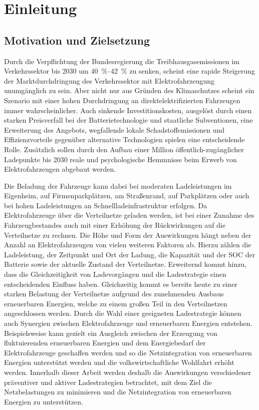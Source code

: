 \section{Einleitung}


\subsection{Motivation und Zielsetzung}

Durch die Verpflichtung der Bundesregierung die Treibhausgasemissionen im Verkehrssektor bis \num{2030} um \SIrange[range-phrase=~bis~]{40}{42}{\percent} \cite{BundesministeriumUmwelt2019} zu senken, scheint eine rapide Steigerung der Marktdurchdringung des Verkehrssektor mit Elektrofahrzeugung unumgänglich zu sein.
Aber nicht nur aus Gründen des Klimaschutzes scheint ein Szenario mit einer hohen Durchdringung an direktelektrifizierten Fahrzeugen immer wahrscheinlicher.
Auch sinkende Investitionskosten, ausgelöst durch einen starken Preisverfall bei der Batterietechnologie und staatliche Subventionen, eine Erweiterung des Angebots, wegfallende lokale Schadstoffemissionen und Effizienzvorteile gegenüber alternative Technologien spielen eine entscheidende Rolle.
Zusätzlich sollen durch den Aufbau einer Million öffentlich-zugänglicher Ladepunkte bis \num{2030} \cite{DieBundesregierung2019} reale und psychologische Hemmnisse beim Erwerb von Elektrofahrzeugen abgebaut werden.\medskip

Die Beladung der Fahrzeuge kann dabei bei moderaten Ladeleistungen im Eigenheim, auf Firmenparkplätzen, am Straßenrand, auf Parkplätzen oder auch bei hohen Ladeleistungen an Schnellladeinfrastruktur erfolgen.
Da Elektrofahrzeuge über die Verteilnetze geladen werden, ist bei einer Zunahme des Fahrzeugbestandes auch mit einer Erhöhung der Rückwirkungen auf die Verteilnetze zu rechnen.
Die Höhe und Form der Auswirkungen hängt neben der Anzahl an Elektrofahrzeugen von vielen weiteren Faktoren ab.
Hierzu zählen die Ladeleistung, der Zeitpunkt und Ort der Ladung, die Kapazität und der \gls{SOC} der Batterie sowie der aktuelle Zustand der Verteilnetze.
Erweiternd kommt hinzu, dass die Gleichzeitigkeit von Ladevorgängen und die Ladestrategie einen entscheidenden Einfluss haben.
Gleichzeitig kommt es bereits heute zu einer starken Belastung der Verteilnetze aufgrund des zunehmenden Ausbaus erneuerbaren Energien, welche zu einem großen Teil in den Verteilnetzen angeschlossen werden. \cite{AgoraEnergiewende2017}
Durch die Wahl einer geeigneten Ladestrategie können auch Synergien zwischen Elektrofahrzeuge und erneuerbaren Energien entstehen.
Beispielsweise kann gezielt ein Ausgleich zwischen der Erzeugung von fluktuierenden erneuerbaren Energien und dem Energiebedarf der Elektrofahrzeuge geschaffen werden und so die Netzintegration von erneuerbaren Energien unterstützt werden und die volkswirtschaftliche Wohlfahrt erhöht werden.
Innerhalb dieser Arbeit werden deshalb die Auswirkungen verschiedener präventiver und aktiver Ladestrategien betrachtet, mit dem Ziel die Netzbelastungen zu minimieren und die Netzintegration von erneuerbaren Energien zu unterstützen.\medskip

